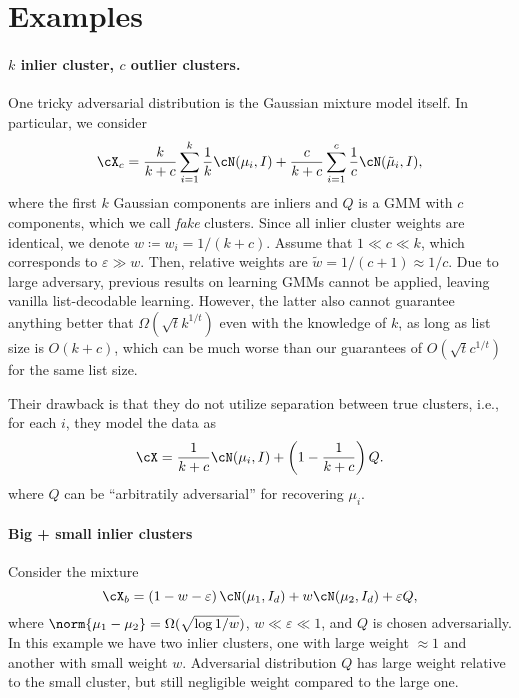 \section{Examples}
\label{app:examples}
\paragraph{\(k\) inlier cluster, \(c\) outlier clusters.}
One tricky adversarial distribution is the Gaussian mixture model itself. In particular, we consider 
\begin{equation}
    \cX_c = \frac{k}{k + c}\sum_{i = 1}^k \frac{1}{k} \cN(\mu_i, I) + \frac{c}{k + c}\sum_{i = 1}^c \frac{1}{c}\cN(\tilde \mu_i, I),
\end{equation}
where the first \(k\) Gaussian components are inliers and \(Q\) is a GMM with \(c\) components, which we call \textit{fake} clusters. 
Since all inlier cluster weights are identical, we denote \(w \coloneqq w_i = 1 / (k + c)\).
Assume that \(1 \ll c \ll k\), which corresponds to \(\varepsilon \gg w\). Then, relative weights are \(\tilde w = 1 / (c + 1) \approx 1 / c\). 
Due to large adversary, previous results on learning GMMs cannot be applied, leaving vanilla list-decodable learning.
However, the latter also cannot guarantee anything better that \(\Omega(\sqrt{t}k^{1/t})\) even with the knowledge of \(k\), 
as long as list size is \(O(k + c)\), which can be much worse than our guarantees of \(O(\sqrt{t}c^{1/t})\) for the same list size.

Their drawback is that they do not utilize separation between true clusters, i.e., for each $i$, they model the data as 
\[\cX = \frac{1}{k + c} \cN(\mu_i, I) + \left(1 - \frac{1}{k + c}\right)Q.\]
where $Q$ can be ``arbitratily adversarial'' for recovering \(\mu_i\).

\paragraph{Big + small inlier clusters}

Consider the mixture
\begin{equation}
    \cX_b = \left(1 - w - \varepsilon\right)\cN(\mu_1, I_d) + w\cN(\mu_2, I_d) + \varepsilon Q,
\end{equation}
where \(\norm{\mu_1 - \mu_2} = \Omega(\sqrt{\log 1 / w})\), \(w \ll \varepsilon \ll 1\), and \(Q\) is chosen adversarially.
In this example we have two inlier clusters, one with large weight \(\approx 1\) and another with small weight \(w\). 
Adversarial distribution \(Q\) has large weight relative to the small cluster, but still negligible weight compared to the large one.

